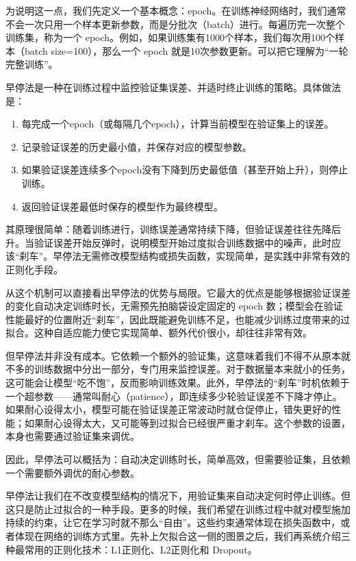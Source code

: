 \documentclass[lang=cn,zihao=-4,a4paper,fontset=windows]{beautybook}
\begin{document}
为说明这一点，我们先定义一个基本概念：epoch。在训练神经网络时，我们通常不会一次只用一个样本更新参数，而是分批次（batch）进行。每遍历完一次整个训练集，称为一个 epoch。例如，如果训练集有1000个样本，我们每次用100个样本（batch size=100），那么一个 epoch 就是10次参数更新。可以把它理解为“一轮完整训练”。

\begin{definition}
早停法是一种在训练过程中监控验证集误差、并适时终止训练的策略。具体做法是：
\begin{enumerate}
\item 每完成一个epoch（或每隔几个epoch），计算当前模型在验证集上的误差。
\item 记录验证误差的历史最小值，并保存对应的模型参数。
\item 如果验证误差连续多个epoch没有下降到历史最低值（甚至开始上升），则停止训练。
\item 返回验证误差最低时保存的模型作为最终模型。
\end{enumerate}
\end{definition}
其原理很简单：随着训练进行，训练误差通常持续下降，但验证误差往往先降后升。当验证误差开始反弹时，说明模型开始过度拟合训练数据中的噪声，此时应该“刹车”。早停法无需修改模型结构或损失函数，实现简单，是实践中非常有效的正则化手段。

从这个机制可以直接看出早停法的优势与局限。它最大的优点是能够根据验证误差的变化自动决定训练时长，无需预先拍脑袋设定固定的 epoch 数；模型会在验证性能最好的位置附近“刹车”，因此既能避免训练不足，也能减少训练过度带来的过拟合。这种自适应能力使它实现简单、额外代价很小，却往往非常有效。

但早停法并非没有成本。它依赖一个额外的验证集，这意味着我们不得不从原本就不多的训练数据中分出一部分，专门用来监控误差。对于数据量本来就小的任务，这可能会让模型“吃不饱”，反而影响训练效果。此外，早停法的“刹车”时机依赖于一个超参数——通常叫耐心（patience），即连续多少轮验证误差不下降才停止。如果耐心设得太小，模型可能在验证误差正常波动时就仓促停止，错失更好的性能；如果耐心设得太大，又可能等到过拟合已经很严重才刹车。这个参数的设置，本身也需要通过验证集来调优。

因此，早停法可以概括为：自动决定训练时长，简单高效，但需要验证集，且依赖一个需要额外调优的耐心参数。

早停法让我们在不改变模型结构的情况下，用验证集来自动决定何时停止训练。但这只是防止过拟合的一种手段。更多的时候，我们希望在训练过程中就对模型施加持续的约束，让它在学习时就不那么“自由”。这些约束通常体现在损失函数中，或者体现在网络的训练方式里。先补上欠拟合这一侧的图景之后，我们再系统介绍三种最常用的正则化技术：L1正则化、L2正则化和 Dropout。
\end{document}
